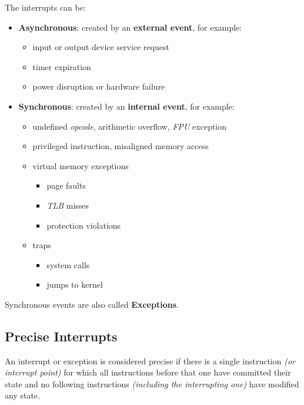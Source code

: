 \documentclass[english]{article}
\begin{document}
\begin{minipage}{0.99\textwidth}
  \bigskip
  The interrupts can be:
  \begin{itemize}
    \item \textbf{Asynchronous}: created by an \textbf{external event}, for example:
          \begin{itemize}
            \item input or output device service request
            \item timer expiration
            \item power disruption or hardware failure
          \end{itemize}
    \item \textbf{Synchronous}: created by an \textbf{internal event}, for example:
          \begin{itemize}
            \item undefined \textit{opcode}, arithmetic overflow, \textit{FPU} exception
            \item privileged instruction, misaligned memory access
            \item virtual memory exceptions
                  \begin{itemize}
                    \item page faults
                    \item \textit{TLB} misses
                    \item protection violations
                  \end{itemize}
            \item traps
                  \begin{itemize}
                    \item system calls
                    \item jumps to kernel
                  \end{itemize}
          \end{itemize}
  \end{itemize}
  \bigskip
\end{minipage}

Synchronous events are also called \textbf{Exceptions}.

\subsection{Precise Interrupts}

An interrupt or exception is considered precise if there is a single instruction \textit{(or interrupt point)} for which all instructions before that one have committed their state and no following instructions \textit{(including the interrupting one)} have modified any state.
\end{document}
